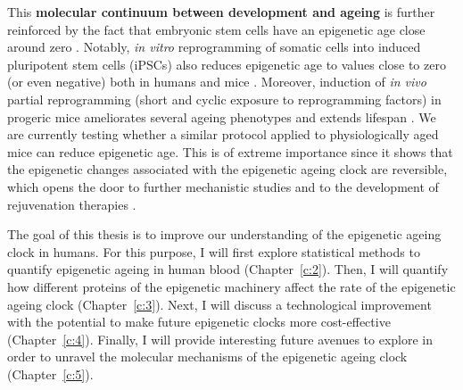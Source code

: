 This \textbf{molecular continuum between development and ageing} is further reinforced by the fact that embryonic stem cells have an epigenetic age close around zero \cite{Horvath2013}. Notably, \textit{in vitro} reprogramming of somatic cells into induced pluripotent stem cells (\acrshort{iPSCs}) also reduces epigenetic age to values close to zero (or even negative) both in humans \cite{Horvath2013} and mice \cite{Petkovich2017,Meer2018}. Moreover, induction of \textit{in vivo} partial reprogramming (short and cyclic exposure to reprogramming factors) in progeric mice ameliorates several ageing phenotypes and extends lifespan \cite{Ocampo2016}. We are currently testing whether a similar protocol applied to physiologically aged mice can reduce epigenetic age. This is of extreme importance since it shows that the epigenetic changes associated with the epigenetic ageing clock are reversible, which opens the door to further mechanistic studies and to the development of rejuvenation therapies \cite{Rando2012,Olova2019,Mahmoudi2019,Sarkar2019}.

\bigskip

The goal of this thesis is to improve our understanding of the epigenetic ageing clock in humans. For this purpose, I will first explore statistical methods to quantify epigenetic ageing in human blood (Chapter~\ref{c:2}). Then, I will quantify how different proteins of the epigenetic machinery affect the rate of the epigenetic ageing clock (Chapter~\ref{c:3}). Next, I will discuss a technological improvement with the potential to make future epigenetic clocks more cost-effective (Chapter~\ref{c:4}). Finally, I will provide interesting future avenues to explore in order to unravel the molecular mechanisms of the epigenetic ageing clock (Chapter~\ref{c:5}). 
